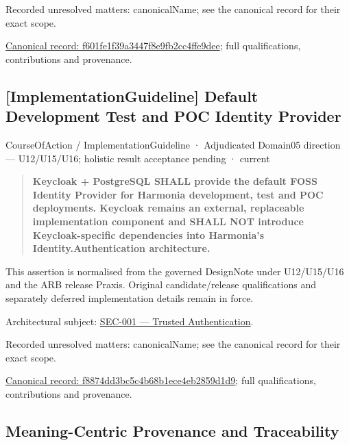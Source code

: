 {\small Recorded unresolved matters: canonicalName; see the canonical record for their exact scope.}\par
{\footnotesize \href{../../../../continuum/strategy/course-of-action/f601fe1f39a3447f8e9fb2cc4ffe9dee.md}{Canonical record: f601fe1f39a3447f8e9fb2cc4ffe9dee}; full qualifications, contributions and provenance.}\par
\subsection{[ImplementationGuideline] Default Development Test and POC Identity Provider}

\label{element:f8874dd3bc5c4b68b1ece4eb2859d1d9}
{\small CourseOfAction / ImplementationGuideline · Adjudicated Domain05 direction — U12/U15/U16; holistic result acceptance pending · current}\par

\begin{quote}


\textbf{Keycloak + PostgreSQL SHALL provide the default FOSS Identity Provider for Harmonia development, test and POC deployments. Keycloak remains an external, replaceable implementation component and SHALL NOT introduce Keycloak-specific dependencies into Harmonia's Identity.Authentication architecture.}



\end{quote}


This assertion is normalised from the governed DesignNote under U12/U15/U16 and the ARB release Praxis. Original candidate/release qualifications and separately deferred implementation details remain in force.



Architectural subject: \hyperref[element:e4998b0a132c41afbe610b11869c3297]{SEC-001 — Trusted Authentication}.


{\small Recorded unresolved matters: canonicalName; see the canonical record for their exact scope.}\par
{\footnotesize \href{../../../../continuum/strategy/course-of-action/implementation-guideline/f8874dd3bc5c4b68b1ece4eb2859d1d9.md}{Canonical record: f8874dd3bc5c4b68b1ece4eb2859d1d9}; full qualifications, contributions and provenance.}\par
\subsection{Meaning-Centric Provenance and Traceability}

